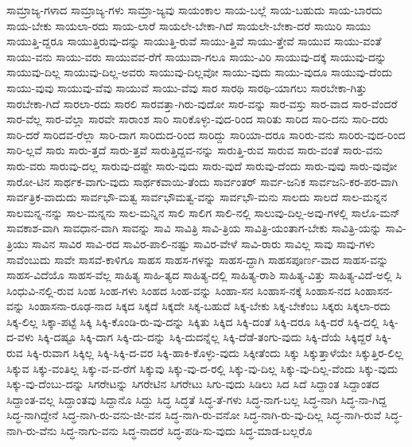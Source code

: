 {ಸಾಮ್ರಾಜ್ಯ-ಗಳಾದ
ಸಾಮ್ರಾಜ್ಯ-ಗಳು
ಸಾಮ್ರಾ-ಜ್ಯವು
ಸಾಯಂಕಾಲ
ಸಾಯ-ಬಲ್ಲೆ
ಸಾಯ-ಬಹುದು
ಸಾಯ-ಬಾರದು
ಸಾಯ-ಬೇಕು
ಸಾಯಲಾ-ರದು
ಸಾಯ-ಲಾರೆ
ಸಾಯಲೇ-ಬೇಕಾ-ಗಿದೆ
ಸಾಯಲೇ-ಬೇಕಾ-ದರೆ
ಸಾಯಿರಿ
ಸಾಯು
ಸಾಯುತ್ತಿ-ದ್ದರೂ
ಸಾಯುತ್ತಿರುವು-ದನ್ನು
ಸಾಯುತ್ತಿ-ರುವೆ
ಸಾಯು-ತ್ತಿವೆ
ಸಾಯು-ತ್ತೇವೆ
ಸಾಯುವ
ಸಾಯು-ವಂತೆ
ಸಾಯು-ವನು
ಸಾಯು-ವರು
ಸಾಯುವವ-ರೆಗೆ
ಸಾಯುವಾ-ಗಲೂ
ಸಾಯು-ವಿರಿ
ಸಾಯುವು-ದಕ್ಕೆ
ಸಾಯುವು-ದನ್ನು
ಸಾಯುವು-ದಿಲ್ಲ
ಸಾಯುವು-ದಿಲ್ಲ-ಅವರು
ಸಾಯುವು-ದಿಲ್ಲವೋ
ಸಾಯು-ವುದು
ಸಾಯು-ವುದೂ
ಸಾಯುವು-ದೆಂದು
ಸಾಯು-ವುವು
ಸಾಯುವು-ವೆವು
ಸಾಯುವೆ
ಸಾಯು-ವೆವು
ಸಾರ
ಸಾರಥಿ
ಸಾರಥಿ-ಯಾಗಲು
ಸಾರಬೇಕಾ-ಗಿತ್ತು
ಸಾರಬೇಕಾ-ಗಿದೆ
ಸಾರಲಾ-ರದು
ಸಾರಲಿ
ಸಾರವತ್ತಾ-ಗಿರು-ವುದೋ
ಸಾರ-ವನ್ನು
ಸಾರ-ವಸ್ತು
ಸಾರ-ವಾದ
ಸಾರ-ವೆಂದರೆ
ಸಾರ-ವೆಲ್ಲ
ಸಾರ-ವೆಲ್ಲಾ
ಸಾರವೇ
ಸಾರಾಂಶ
ಸಾರಿ
ಸಾರಿಕೊಳ್ಳು-ವುದ-ರಿಂದ
ಸಾರಿತು
ಸಾರಿದ
ಸಾರಿ-ದನು
ಸಾರಿ-ದರು
ಸಾರಿ-ದರೆ
ಸಾರಿದವ-ರೆಲ್ಲಾ
ಸಾರಿ-ದಾಗ
ಸಾರಿದುದ-ರಿಂದ
ಸಾರಿದ್ದು
ಸಾರಿಯಾ-ದರೂ
ಸಾರಿರು-ವನು
ಸಾರಿರು-ವುದ-ರಿಂದ
ಸಾರಿ-ಲ್ಲವೆ
ಸಾರು
ಸಾರು-ತ್ತದೆ
ಸಾರು-ತ್ತವೆ
ಸಾರುತ್ತಿದ್ದವ-ನನ್ನು
ಸಾರುತ್ತಿ-ರುವ
ಸಾರುವ
ಸಾರು-ವಂತೆ
ಸಾರು-ವನು
ಸಾರು-ವರು
ಸಾರುವು-ದಲ್ಲ
ಸಾರುವು-ದಷ್ಟೇ
ಸಾರು-ವುದು
ಸಾರು-ವುದೆ
ಸಾರುವು-ದೆಂದು
ಸಾರು-ವುವು
ಸಾರು-ವುವೋ
ಸಾರೋ-ಟಿನ
ಸಾರ್ಥಕ-ವಾಗು-ವುದು
ಸಾರ್ಥಕವಾಯಿ-ತೆಂದು
ಸಾರ್ವಂತರ್
ಸಾರ್ವ-ಜನಿಕ
ಸಾರ್ವಜನಿ-ಕರ-ಪರ-ವಾಗಿ
ಸಾರ್ವತ್ರಿಕ-ವಾದುದು
ಸಾರ್ವಭೌ-ಮತ್ವ
ಸಾರ್ವಭೌಮತ್ವ-ವನ್ನು
ಸಾರ್ವಭೌ-ಮನು
ಸಾಲದು
ಸಾಲದೆ
ಸಾಲ-ಮನ್ನನ
ಸಾಲಮನ್ನ-ನನ್ನು
ಸಾಲ-ಮನ್ನನು
ಸಾಲ-ಮನ್ನಿನ
ಸಾಲಿ
ಸಾಲಿಗ
ಸಾಲಿ-ನಲ್ಲಿ
ಸಾಲುವು-ದಿಲ್ಲ-ಅವು-ಗಳಲ್ಲಿ
ಸಾಲೊ-ಮನ್
ಸಾವಕಾಶ-ವಾಗಿ
ಸಾವಧಾನ-ವಾಗಿ
ಸಾವನ್ನು
ಸಾವಿ
ಸಾವಿತ್ರಿ
ಸಾವಿ-ತ್ರಿಯ
ಸಾವಿತ್ರಿ-ಯಂತಾಗ-ಬೇಕು
ಸಾವಿತ್ರಿ-ಯನ್ನು
ಸಾವಿ-ತ್ರಿಯು
ಸಾವಿನ
ಸಾವಿರ
ಸಾವಿ-ರದ
ಸಾವಿರ-ಪಾಲಿ-ನಷ್ಟು
ಸಾವಿರ-ವೇಳೆ
ಸಾವಿ-ರಾರು
ಸಾವಿಲ್ಲ
ಸಾವು
ಸಾವು-ಗಳು
ಸಾವೆಂಬುದು
ಸಾವೇ
ಸಾಸವೆ-ಕಾಳಿಗೂ
ಸಾಹಸ
ಸಾಹಸ-ಗಳನ್ನು
ಸಾಹಸ-ದ್ದಾಗಿ
ಸಾಹಸಪೂರ್ಣ-ವಾದ
ಸಾಹಸ-ವನ್ನು
ಸಾಹಸ-ವಿದೆಯೊ
ಸಾಹಸ-ವೆಲ್ಲ
ಸಾಹಿತ್ಯ
ಸಾಹಿ-ತ್ಯದ
ಸಾಹಿತ್ಯ-ದಲ್ಲಿ
ಸಾಹಿತ್ಯ-ರಾಶಿ
ಸಾಹಿತ್ಯ-ವಿತ್ತು
ಸಾಹಿತ್ಯ-ವಿದೆ-ಅಲ್ಲಿ
ಸಿ
ಸಿಂಧುವಿ-ನಲ್ಲಿ-ರುವ
ಸಿಂಹ
ಸಿಂಹ-ಗಳು
ಸಿಂಹದ
ಸಿಂಹ-ವನ್ನು
ಸಿಂಹಾ-ಸನ
ಸಿಂಹಾಸ-ನಕ್ಕೆ
ಸಿಂಹಾಸ-ನದ
ಸಿಂಹಾಸನ-ವನ್ನು
ಸಿಂಹಾಸನಾ-ರೂಢ-ನಾದ
ಸಿಕ್ಕದ
ಸಿಕ್ಕದೆ
ಸಿಕ್ಕದೇ
ಸಿಕ್ಕ-ಬಹುದೆ
ಸಿಕ್ಕ-ಬೇಕು
ಸಿಕ್ಕ-ಬೇಕೆಂಬ
ಸಿಕ್ಕರು
ಸಿಕ್ಕಲಾ-ರದು
ಸಿಕ್ಕ-ಲಿಲ್ಲ
ಸಿಕ್ಕಾ-ಪಟ್ಟೆ
ಸಿಕ್ಕಿ
ಸಿಕ್ಕಿ-ಕೊಂಡಿ-ರು-ವು-ದನ್ನು
ಸಿಕ್ಕಿತು
ಸಿಕ್ಕಿದ
ಸಿಕ್ಕಿ-ದಂತೆ
ಸಿಕ್ಕಿ-ದರೂ
ಸಿಕ್ಕಿ-ದರೆ
ಸಿಕ್ಕಿ-ದಲ್ಲಿ
ಸಿಕ್ಕಿ-ದ-ವಳು
ಸಿಕ್ಕಿ-ದಷ್ಟೂ
ಸಿಕ್ಕಿ-ದಾಗ
ಸಿಕ್ಕಿ-ದು-ದನ್ನು
ಸಿಕ್ಕಿ-ದುದನ್ನೆಲ್ಲ
ಸಿಕ್ಕಿ-ದೆಡೆ-ತಂಗು-ವುದು
ಸಿಕ್ಕಿ-ದೆಯೆ
ಸಿಕ್ಕಿದ್ದರೆ
ಸಿಕ್ಕಿ-ರುವ
ಸಿಕ್ಕಿ-ರುವಾಗ
ಸಿಕ್ಕಿಲ್ಲ
ಸಿಕ್ಕಿ-ಸಿಕ್ಕಿ-ದ-ವರ
ಸಿಕ್ಕಿ-ಹಾಕಿ-ಕೊಳ್ಳು-ವುದು
ಸಿಕ್ಕೀತೆಂದು
ಸಿಕ್ಕು
ಸಿಕ್ಕುತ್ತಾಳೆಯೇ
ಸಿಕ್ಕುತ್ತಿರ-ಲಿಲ್ಲ
ಸಿಕ್ಕುವ
ಸಿಕ್ಕು-ವಂತಿಲ್ಲ
ಸಿಕ್ಕು-ವ-ವ-ರೆಗೆ
ಸಿಕ್ಕುವು
ಸಿಕ್ಕು-ವು-ದ-ರಲ್ಲಿ
ಸಿಕ್ಕು-ವು-ದಿಲ್ಲ
ಸಿಕ್ಕು-ವು-ದಿಲ್ಲ-ವೆಂದು
ಸಿಕ್ಕು-ವುದು
ಸಿಕ್ಕು-ವು-ದೆಂಬು-ದನ್ನು
ಸಿಗರೇಟನ್ನು
ಸಿಗರೇಟಿನ
ಸಿಗರೇಟು
ಸಿಗು-ವುದು
ಸಿಡಿಲು
ಸಿದ
ಸಿದೆ
ಸಿದ್ದಾಂತ
ಸಿದ್ದಾಂತದ
ಸಿದ್ದಾಂತ-ವಲ್ಲ
ಸಿದ್ದಾಂತವು
ಸಿದ್ದಾನೊ
ಸಿದ್ದು
ಸಿದ್ಧ
ಸಿದ್ಧತೆ
ಸಿದ್ಧ-ತೆ-ಗಳು
ಸಿದ್ಧ-ನಾಗ-ಬಲ್ಲ
ಸಿದ್ಧ-ನಾಗಿ
ಸಿದ್ಧ-ನಾ-ಗಿದ್ದ
ಸಿದ್ಧ-ನಾಗಿದ್ದೇನೆ
ಸಿದ್ಧ-ನಾಗಿ-ರು-ವನು-ಜೀ-ವನ
ಸಿದ್ಧ-ನಾಗಿ-ರು-ವನೋ
ಸಿದ್ಧ-ನಾಗಿ-ರು-ವು-ದಿಲ್ಲ
ಸಿದ್ಧ-ನಾಗಿ-ರುವೆ
ಸಿದ್ಧ-ನಾಗಿ-ರು-ವೆನು
ಸಿದ್ಧ-ನಾಗು-ವನು
ಸಿದ್ಧ-ನಾದರೆ
ಸಿದ್ಧ-ಪಡಿ-ಸು-ವುದು
ಸಿದ್ಧ-ಮಾಡ-ಬಲ್ಲರೊ
}
